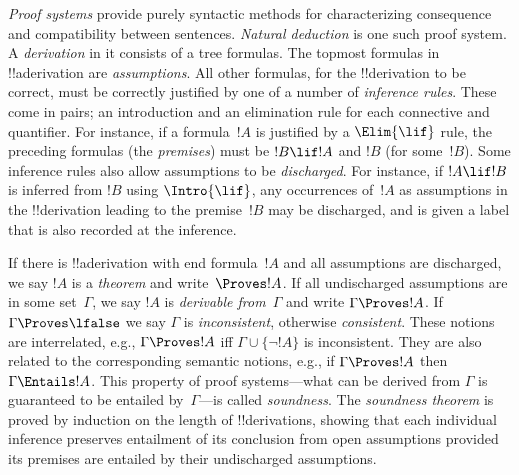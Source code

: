 \emph{Proof systems} provide purely syntactic methods for
characterizing consequence and compatibility between
sentences. \emph{Natural deduction} is one such proof
system. A \emph{derivation} in it consists of a tree formulas. The
topmost formulas in !!a{derivation} are \emph{assumptions}.  All other
formulas, for the !!{derivation} to be correct, must be correctly
justified by one of a number of \emph{inference rules}. These come in
pairs; an introduction and an elimination rule for each connective and
quantifier. For instance, if a formula~$!A$ is justified by a
$\Elim{\lif}$ rule, the preceding formulas (the \emph{premises}) must
be $!B \lif !A$ and $!B$ (for some~$!B$). Some inference rules also
allow assumptions to be \emph{discharged}. For instance, if $!A \lif
!B$ is inferred from $!B$ using $\Intro{\lif}$, any occurrences
of~$!A$ as assumptions in the !!{derivation} leading to the premise~$!B$
may be discharged, and is given a label that is also recorded at the
inference.

If there is !!a{derivation} with end formula~$!A$ and all assumptions are
discharged, we say $!A$ is a \emph{theorem} and write~$\Proves !A$. If
all undischarged assumptions are in some set~$\Gamma$, we say $!A$ is
\emph{derivable from}~$\Gamma$ and write $\Gamma \Proves !A$. If
$\Gamma \Proves \lfalse$ we say $\Gamma$ is \emph{inconsistent}, otherwise
\emph{consistent}. These notions are interrelated, e.g., $\Gamma
\Proves !A$ iff $\Gamma \cup \{\lnot !A\}$ is inconsistent. They are
also related to the corresponding semantic notions, e.g., if $\Gamma
\Proves !A$ then $\Gamma \Entails !A$. This property of proof
systems---what can be derived from $\Gamma$ is guaranteed to be
entailed by~$\Gamma$---is called \emph{soundness}. The \emph{soundness
theorem} is proved by induction on the length of !!{derivation}s, showing
that each individual inference preserves entailment of its conclusion
from open assumptions provided its premises are entailed by their undischarged
assumptions.
